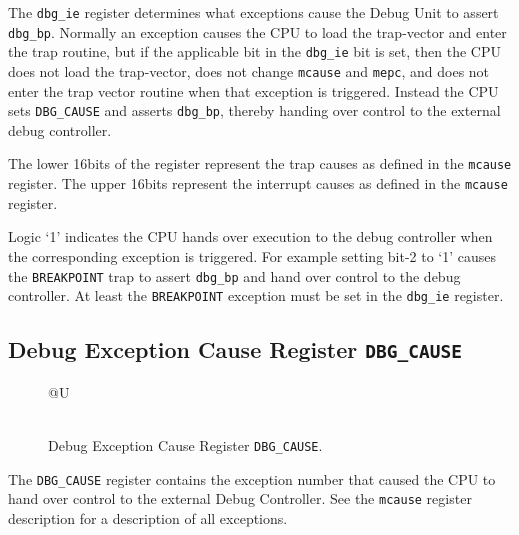 The \texttt{dbg\_ie} register determines what exceptions cause the Debug Unit to
assert \texttt{dbg\_bp}. Normally an exception causes the CPU to load the
trap-vector and enter the trap routine, but if the applicable bit in the
\texttt{dbg\_ie} bit is set, then the CPU does not load the trap-vector, does not
change \texttt{mcause} and \texttt{mepc}, and does not enter the trap vector routine when
that exception is triggered. Instead the CPU sets \texttt{DBG\_CAUSE} and asserts
\texttt{dbg\_bp}, thereby handing over control to the external debug controller.

The lower 16bits of the register represent the trap causes as defined in
the \texttt{mcause} register. The upper 16bits represent the interrupt causes as
defined in the \texttt{mcause} register.

Logic `1' indicates the CPU hands over execution to the debug controller
when the corresponding exception is triggered. For example setting bit-2
to `1' causes the \texttt{BREAKPOINT} trap to assert \texttt{dbg\_bp} and hand over
control to the debug controller. At least the \texttt{BREAKPOINT} exception must
be set in the \texttt{dbg\_ie} register.

\subsection{Debug Exception Cause Register
{\tt DBG\_CAUSE}}\label{debug-exception-cause-register-dbg_cause}

\begin{figure*}[h!]
	{\footnotesize
		\begin{center}
			\begin{tabular}{@{}U}
				 \\
				\hline
				  \\
				\hline
			\end{tabular}
		\end{center}
	}
	\vspace{-0.1in}
	\caption{Debug Exception Cause Register {\tt DBG\_CAUSE}.}
	\label{fig:dbgcausereg}
\end{figure*}

The \texttt{DBG\_CAUSE} register contains the exception number that caused the
CPU to hand over control to the external Debug Controller. See the
\texttt{mcause} register description for a description of all exceptions.

